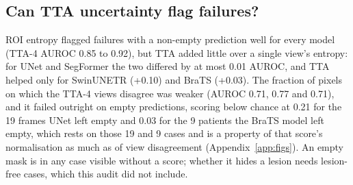 \subsection{Can TTA uncertainty flag failures?}
\label{sec:res-uncertainty}
ROI entropy flagged failures with a non-empty prediction well for every model (TTA-4 AUROC 0.85 to 0.92), but TTA added little over a single view's entropy: for UNet and SegFormer the two differed by at most 0.01 AUROC, and TTA helped only for SwinUNETR (+0.10) and BraTS (+0.03). The fraction of pixels on which the TTA-4 views disagree was weaker (AUROC 0.71, 0.77 and 0.71), and it failed outright on empty predictions, scoring below chance at 0.21 for the 19 frames UNet left empty and 0.03 for the 9 patients the BraTS model left empty, which rests on those 19 and 9 cases and is a property of that score's normalisation as much as of view disagreement (Appendix~\ref{app:figs}). An empty mask is in any case visible without a score; whether it hides a lesion needs lesion-free cases, which this audit did not include.

